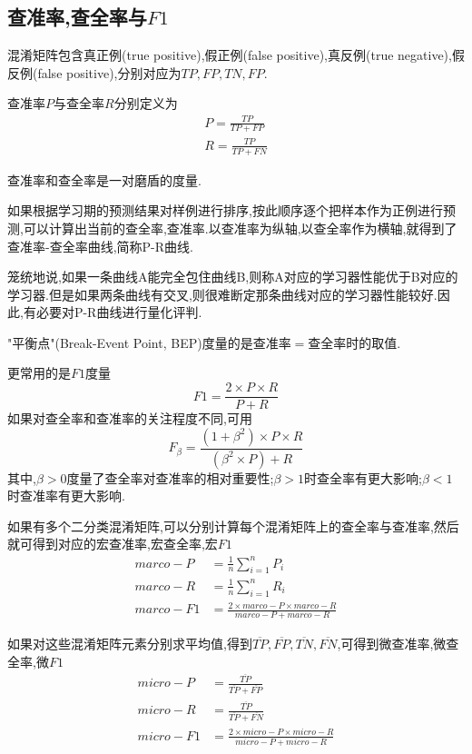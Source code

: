 \subsection{查准率,查全率与$F1$}

混淆矩阵包含真正例(true positive),假正例(false positive),真反例(true negative),假反例(false positive),分别对应为$TP,FP,TN,FP$.

查准率$P$与查全率$R$分别定义为
\begin{equation}\begin{split}
P=\frac{TP}{TP+FP}\\
R=\frac{TP}{TP+FN}
\end{split}\end{equation}

查准率和查全率是一对磨盾的度量.

如果根据学习期的预测结果对样例进行排序,按此顺序逐个把样本作为正例进行预测,可以计算出当前的查全率,查准率.以查准率为纵轴,以查全率作为横轴,就得到了查准率-查全率曲线,简称P-R曲线.

笼统地说,如果一条曲线A能完全包住曲线B,则称A对应的学习器性能优于B对应的学习器.但是如果两条曲线有交叉,则很难断定那条曲线对应的学习器性能较好.因此,有必要对P-R曲线进行量化评判.

"平衡点"(Break-Event Point, BEP)度量的是查准率$=$查全率时的取值.

更常用的是$F1$度量
\begin{equation}
F1=\frac{2\times P\times R}{P+R}
\end{equation}
如果对查全率和查准率的关注程度不同,可用
\begin{equation}
F_\beta=\frac{(1+\beta^2)\times P\times R}{(\beta^2\times P)+R}
\end{equation}
其中,$\beta>0$度量了查全率对查准率的相对重要性;$\beta>1$时查全率有更大影响;$\beta<1$时查准率有更大影响.

如果有多个二分类混淆矩阵,可以分别计算每个混淆矩阵上的查全率与查准率,然后就可得到对应的宏查准率,宏查全率,宏$F1$
\begin{equation}\begin{split}
marco-P&=\frac{1}{n}\sum_{i=1}^nP_i\\
marco-R&=\frac{1}{n}\sum_{i=1}^nR_i\\
marco-F1&=\frac{2\times marco-P \times marco-R}{marco-P+marco-R}
\end{split}\end{equation}

如果对这些混淆矩阵元素分别求平均值,得到$\overline{TP},\overline{FP},\overline{TN},\overline{FN}$,可得到微查准率,微查全率,微$F1$
\begin{equation}\begin{split}
micro-P&=\frac{\overline{TP}}{\overline{TP}+\overline{FP}}\\
micro-R&=\frac{\overline{TP}}{\overline{TP}+\overline{FN}}\\
micro-F1&=\frac{2\times micro-P \times micro-R}{micro-P+micro-R}
\end{split}\end{equation}

